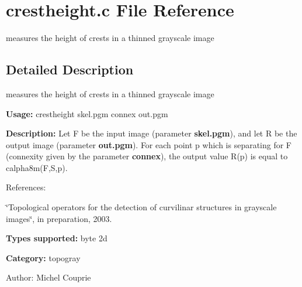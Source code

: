 \section{crestheight.c File Reference}
\label{crestheight_8c}
measures the height of crests in a thinned grayscale image 



\subsection{Detailed Description}
measures the height of crests in a thinned grayscale image 

{\bf Usage:} crestheight skel.pgm connex out.pgm

{\bf Description:} Let F be the input image (parameter {\bf skel.pgm}), and let R be the output image (parameter {\bf out.pgm}). For each point p which is separating for F (connexity given by the parameter {\bf connex}), the output value R(p) is equal to calpha8m(F,S,p).

References:\par
 \char`\"{}Topological operators for the detection of curvilinar structures in grayscale images\char`\"{}, in preparation, 2003.

{\bf Types supported:} byte 2d

{\bf Category:} topogray

\begin{Desc}
\item[Author:]Michel Couprie \end{Desc}
